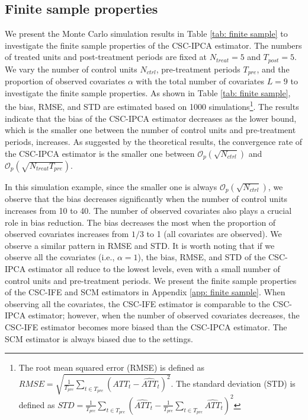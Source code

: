 \documentclass[12pt]{article}
\begin{document}
\subsection{Finite sample properties}
\label{sec: finite sample}
We present the Monte Carlo simulation results in Table \ref{tab: finite sample} to investigate the finite sample properties of the CSC-IPCA estimator. The numbers of treated units and post-treatment periods are fixed at $N_{treat} = 5$ and $T_{post} = 5$. We vary the number of control units $N_{ctrl}$, pre-treatment periods $T_{pre}$, and the proportion of observed covariates $\alpha$ with the total number of covariates $L = 9$ to investigate the finite sample properties. As shown in Table \ref{tab: finite sample}, the bias, RMSE, and STD are estimated based on 1000 simulations\footnote{The root mean squared error (RMSE) is defined as $RMSE = \sqrt{\frac{1}{T_{pre}} \sum_{t \in T_{pre}} \left(ATT_t - \widehat{ATT}_t \right)^2}$. The standard deviation (STD) is defined as $STD = \frac{1}{T_{pre}} \sum_{t \in T_{pre}} \left(\widehat{ATT}_t - \frac{1}{T_{pre}} \sum_{t \in T_{pre}} \widehat{ATT}_t \right)^2$}. The results indicate that the bias of the CSC-IPCA estimator decreases as the lower bound, which is the smaller one between the number of control units and pre-treatment periods, increases. As suggested by the theoretical results, the convergence rate of the CSC-IPCA estimator is the smaller one between $\mathcal{O}_p\left(\sqrt{N_{ctrl}}\right)$ and $\mathcal{O}_p\left(\sqrt{N_{treat}T_{pre}}\right)$. 

In this simulation example, since the smaller one is always $\mathcal{O}_p\left(\sqrt{N_{ctrl}}\right)$, we observe that the bias decreases significantly when the number of control units increases from 10 to 40. The number of observed covariates also plays a crucial role in bias reduction. The bias decreases the most when the proportion of observed covariates increases from $1/3$ to 1 (all covariates are observed). We observe a similar pattern in RMSE and STD. It is worth noting that if we observe all the covariates (i.e., $\alpha = 1$), the bias, RMSE, and STD of the CSC-IPCA estimator all reduce to the lowest levels, even with a small number of control units and pre-treatment periods. We present the finite sample properties of the CSC-IFE and SCM estimators in Appendix \ref{app: finite sample}. When observing all the covariates, the CSC-IFE estimator is comparable to the CSC-IPCA estimator; however, when the number of observed covariates decreases, the CSC-IFE estimator becomes more biased than the CSC-IPCA estimator. The SCM estimator is always biased due to the settings.
\end{document}
